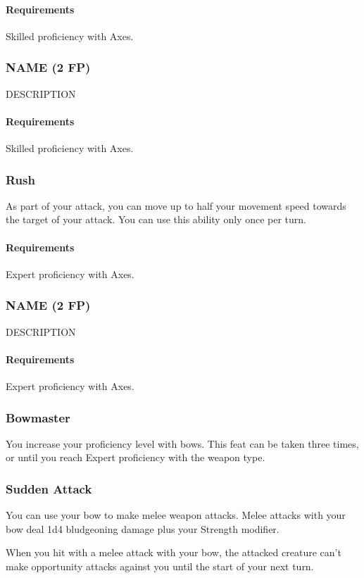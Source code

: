     \paragraph{Requirements} Skilled proficiency with Axes.
\subsubsection{NAME (2 FP)} \label{feat::name}
    DESCRIPTION
    \paragraph{Requirements} Skilled proficiency with Axes.
\subsubsection{Rush} \label{feat::rush}
    As part of your attack, you can move up to half your movement speed towards the target of your attack.
    You can use this ability only once per turn.
    \paragraph{Requirements} Expert proficiency with Axes.
\subsubsection{NAME (2 FP)} \label{feat::name}
    DESCRIPTION
    \paragraph{Requirements} Expert proficiency with Axes.
\subsubsection{Bowmaster} \label{feat::bowmaster}
    You increase your proficiency level with bows.
    This feat can be taken three times, or until you reach Expert proficiency with the weapon type.
\subsubsection{Sudden Attack} \label{feat::suddenattack}
    You can use your bow to make melee weapon attacks.
    Melee attacks with your bow deal 1d4 bludgeoning damage plus your Strength modifier.

    When you hit with a melee attack with your bow, the attacked creature can't make opportunity attacks against you until the start of your next turn.
